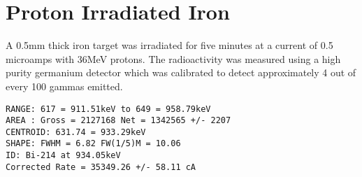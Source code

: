 \section{Proton Irradiated Iron}

A 0.5mm thick iron target was irradiated for five minutes at a current of 0.5 microamps with 36MeV protons.  The radioactivity was measured using a high purity germanium detector which was calibrated to detect approximately 4 out of every 100 gammas emitted.







\begin{lstlisting}[style=sMaestro,caption={Mailshot Extract}]
RANGE: 617 = 911.51keV to 649 = 958.79keV
AREA : Gross = 2127168 Net = 1342565 +/- 2207
CENTROID: 631.74 = 933.29keV
SHAPE: FWHM = 6.82 FW(1/5)M = 10.06
ID: Bi-214 at 934.05keV
Corrected Rate = 35349.26 +/- 58.11 cA
\end{lstlisting}











